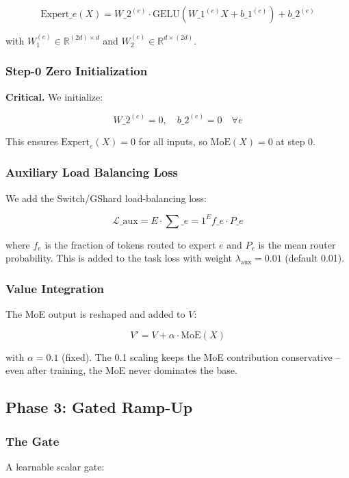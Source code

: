 \[
\text{Expert}\_e(X) = W\_2^{(e)} \cdot \text{GELU}(W\_1^{(e)} X + b\_1^{(e)}) + b\_2^{(e)}
\]

with $W_1^{(e)} \in \mathbb{R}^{(2d) \times d}$ and 
$W_2^{(e)} \in \mathbb{R}^{d \times (2d)}$.

\subsubsection{Step-0 Zero Initialization}

\textbf{Critical.} We initialize:

\[
W\_2^{(e)} = 0, \quad b\_2^{(e)} = 0 \quad \forall e
\]

This ensures $\text{Expert}_e(X) = 0$ for all inputs, so 
$\text{MoE}(X) = 0$ at step 0.

\subsubsection{Auxiliary Load Balancing Loss}

We add the Switch/GShard load-balancing loss:

\[
\mathcal{L}\_\text{aux} = E \cdot \sum\_{e=1}^{E} f\_e \cdot P\_e
\]

where $f_e$ is the fraction of tokens routed to expert $e$ and $P_e$ is 
the mean router probability. This is added to the task loss with weight 
$\lambda_\text{aux} = 0.01$ (default 0.01).

\subsubsection{Value Integration}

The MoE output is reshaped and added to $V$:

\[
V' = V + \alpha \cdot \text{MoE}(X)
\]

with $\alpha = 0.1$ (fixed). The 0.1 scaling keeps the MoE contribution 
conservative -- even after training, the MoE never dominates the base.

\subsection{Phase 3: Gated Ramp-Up}

\subsubsection{The Gate}

A learnable scalar gate:


